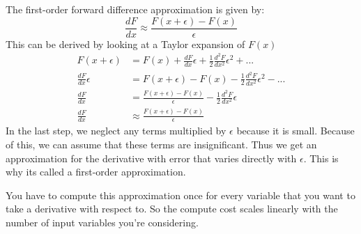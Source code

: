 \documentclass[conf]{new-aiaa}
\begin{document}
    The first-order forward difference approximation is given by: 
    \begin{equation}
        \frac{dF}{dx} \approx \frac{F(x+\epsilon) - F(x)}{\epsilon}
    \end{equation}
    This can be derived by looking at a Taylor expansion of $F(x)$
    \begin{align}
        F(x+\epsilon) &= F(x) + \frac{dF}{dx}\epsilon + \frac{1}{2}\frac{d^2F}{dx^2}\epsilon^2 + ... \\
        \frac{dF}{dx}\epsilon &= F(x+\epsilon) - F(x) - \frac{1}{2}\frac{d^2F}{dx^2}\epsilon^2 - ... \\
        \frac{dF}{dx} &= \frac{F(x+\epsilon) - F(x)}{\epsilon} - \frac{1}{2}\frac{d^2F}{dx^2}\epsilon \\
        \frac{dF}{dx} &\approx \frac{F(x+\epsilon) - F(x)}{\epsilon}
    \end{align}
    In the last step, we neglect any terms multiplied by $\epsilon$ because it is small. Because of this, we can assume that these terms are insignificant. 
    Thus we get an approximation for the derivative with error that varies directly with $\epsilon$. 
    This is why its called a first-order approximation. 

    You have to compute this approximation once for every variable that you want to take a derivative with respect to. 
    So the compute cost scales linearly with the number of input variables you're considering. 
\end{document}
